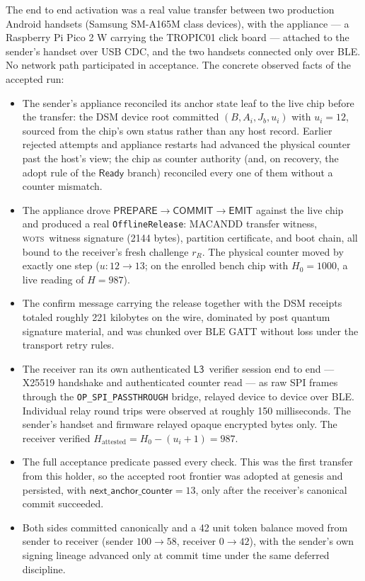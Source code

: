 \documentclass[11pt]{article}
\theoremstyle{definition}
\theoremstyle{remark}
\newcommand{\WOTS}{\textsc{wots}}
\newcommand{\Lthree}{\ensuremath{\mathsf{L3}}}
\newcommand{\Ready}{\ensuremath{\mathsf{Ready}}}
\newcommand{\Bundle}{\ensuremath{B}}
\newcommand{\Ahead}{\ensuremath{A}}
\newcommand{\Bhead}{\ensuremath{J}}
\begin{document}
The end to end activation was a real value transfer between two production Android handsets
(Samsung SM-A165M class devices), with the appliance --- a Raspberry Pi Pico 2 W carrying the
TROPIC01 click board --- attached to the sender's handset over USB CDC, and the two handsets
connected only over BLE. No network path participated in acceptance. The concrete observed facts
of the accepted run:

\begin{itemize}
\item The sender's appliance reconciled its anchor state leaf to the live chip before the
transfer: the DSM device root committed \((\Bundle,\Ahead_i,\Bhead_b,u_i)\) with \(u_i=12\),
sourced from the chip's own status rather than any host record. Earlier rejected attempts and
appliance restarts had advanced the physical counter past the host's view; the chip as counter
authority (and, on recovery, the adopt rule of the \(\Ready\) branch) reconciled every one of
them without a counter mismatch.
\item The appliance drove \(\mathsf{PREPARE}\rightarrow\mathsf{COMMIT}\rightarrow\mathsf{EMIT}\)
against the live chip and produced a real \texttt{OfflineRelease}: MACANDD transfer witness,
\WOTS\ witness signature (2144 bytes), partition certificate, and boot chain, all bound to the
receiver's fresh challenge \(r_R\). The physical counter moved by exactly one step
(\(u:12\rightarrow 13\); on the enrolled bench chip with \(H_0=1000\), a live reading of
\(H=987\)).
\item The confirm message carrying the release together with the DSM receipts totaled roughly
221 kilobytes on the wire, dominated by post quantum signature material, and was chunked over
BLE GATT without loss under the transport retry rules.
\item The receiver ran its own authenticated \Lthree\ verifier session end to end --- X25519
handshake and authenticated counter read --- as raw SPI frames through the
\texttt{OP\_SPI\_PASSTHROUGH} bridge, relayed device to device over BLE. Individual relay round
trips were observed at roughly 150 milliseconds. The sender's handset and firmware relayed
opaque encrypted bytes only. The receiver verified
\(H_{\mathrm{attested}}=H_0-(u_i+1)=987\).
\item The full acceptance predicate passed every check. This was the first transfer from this
holder, so the accepted root frontier was adopted at genesis and persisted, with
\(\mathsf{next\_anchor\_counter}=13\), only after the receiver's canonical commit succeeded.
\item Both sides committed canonically and a 42 unit token balance moved from sender to receiver
(sender \(100\rightarrow 58\), receiver \(0\rightarrow 42\)), with the sender's own signing
lineage advanced only at commit time under the same deferred discipline.
\end{itemize}
\end{document}
